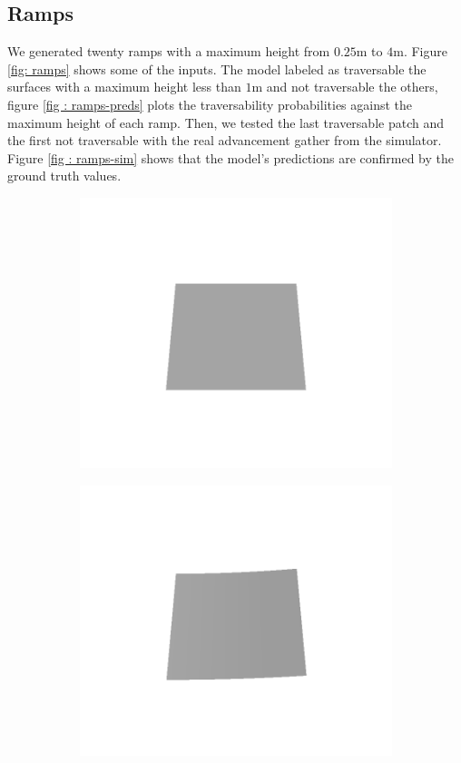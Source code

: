 \documentclass[../document.tex]{subfiles}
\begin{document}
\subsection{Ramps}
We generated twenty ramps with a maximum height from $0.25$m to $4$m. Figure \ref{fig: ramps} shows some of the inputs. The model labeled as traversable the surfaces with a maximum height less than $1$m and not traversable the others, figure \ref{fig : ramps-preds} plots the traversability probabilities against the maximum height of each ramp. Then, we tested the last traversable patch and the first not traversable with the real advancement gather from the simulator. Figure \ref{fig : ramps-sim} shows that the model's predictions are confirmed by the ground truth values. 
\begin{figure}[htbp]
    \centering
    \begin{subfigure}[b]{0.24\linewidth}
    \includegraphics[width=\linewidth]{../img/5/custom_patches/ramp/all/00-3d.png}
    \end{subfigure}
    \begin{subfigure}[b]{0.24\linewidth}
    \includegraphics[width=\linewidth]{../img/5/custom_patches/ramp/all/03-3d.png}

\end{subfigure}
\end{figure}
\end{document}
